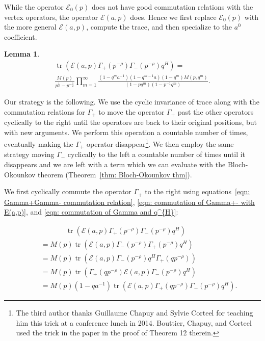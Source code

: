 \documentclass[12pt]{amsart}
\newcommand{\half}{\frac{1}{2}}
\newtheorem{lemma}[theorem]{Lemma}
\theoremstyle{definition}
\newcommand{\tr}{\operatorname{tr}}
\newcommand{\E}{\mathcal{E}}
\newcommand{\ptotheminusrho}{p^{-\rho}}
\begin{document}
While the operator $\E_{0}(p)$ does not have good commutation
relations with the vertex operators, the operator $\E (a,p)$
does. Hence we first replace $\E_{0}(p)$ with the more general $\E
(a,p)$, compute the trace, and then specialize to the $a^{0}$
coefficient.
\begin{lemma}\label{lem: trace of E Gamma+Gamma-q^{H}}
\begin{multline*}
\tr \left(\E (a,p)\Gamma_{+}(\ptotheminusrho )\Gamma_{-}(\ptotheminusrho )q^{H}
\right) = \\
\frac{M(p)}{p^{\half}-p^{-\half}}\prod_{m=1}^{\infty}
\frac{(1-q^{m}a^{-1})(1-q^{m-1}a)(1-q^{m})
M(p,q^{m})}{(1-pq^{m})(1-p^{-1}q^{m})}.
\end{multline*}
\end{lemma}
\proof Our strategy is the following. We use the cyclic invariance of
trace along with the commutation relations for $\Gamma_{+}$ to move
the operator $\Gamma_{+}$ past the other operators cyclically to the
right until the operators are back to their original positions, but
with new arguments. We perform this operation a countable number of
times, eventually making the $\Gamma_{+}$ operator
disappear\footnote{The third author thanks Guillaume Chapuy and Sylvie
Corteel for teaching him this trick at a conference lunch in
2014. Bouttier, Chapuy, and Corteel used the trick in the paper
\cite{Bouttier-Chapuy-Corteel} in the proof of Theorem 12
therein.}. We then employ the same strategy moving $\Gamma_{-}$
cyclically to the left a countable number of times until it disappears
and we are left with a term which we can evaluate with the
Bloch-Okounkov theorem (Theorem~\ref{thm: Bloch-Okounkov thm}).

We first cyclically commute the operator $\Gamma_{+}$ to the right
using equations~\eqref{eqn: Gamma+Gamma- commutation relation},
\eqref{eqn: commutation of Gamma+- with E(a,p)}, and \eqref{eqn:
commutation of Gamma and q^{H}}:

\begin{align*}
\quad &\quad \quad \quad \,\,\, \tr (\E (a,p)\Gamma_{+}(\ptotheminusrho)\Gamma_{-}(\ptotheminusrho
)q^{H})\\
& = M(p)\tr (\E (a,p)\Gamma_{-}(\ptotheminusrho)\Gamma_{+}(\ptotheminusrho
)q^{H})\\
& = M(p)\tr (\E (a,p)\Gamma_{-}(\ptotheminusrho)q^{H}\Gamma_{+}(q\ptotheminusrho
))\\
& = M(p)\tr (\Gamma_{+}(q\ptotheminusrho
)\E (a,p)\Gamma_{-}(\ptotheminusrho)q^{H})\\
& = M(p)(1-qa^{-1})\tr (\E (a,p)\Gamma_{+}(q\ptotheminusrho) \Gamma_{-}(\ptotheminusrho)q^{H}).
\end{align*}
\end{document}
